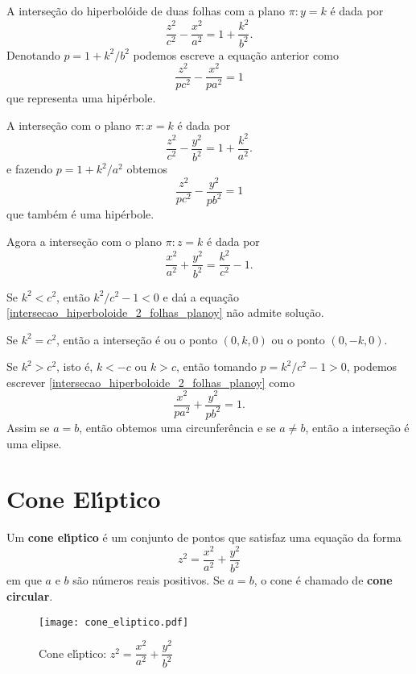 A interse\c{c}\~ao do hiperbol\'oide de duas folhas com a plano $\pi: y = k$ \'e dada por
\[
	\dfrac{z^2}{c^2} - \dfrac{x^2}{a^2} = 1 +  \dfrac{k^2}{b^2}.
\]
Denotando $p = 1 + k^2/b^2$ podemos escreve a equa\c{c}\~ao anterior como
\[
	\dfrac{z^2}{pc^2} - \dfrac{x^2}{pa^2} = 1
\]
que representa uma hip\'erbole.

A interse\c{c}\~ao com o plano $\pi: x = k$ \'e dada por
\[
	\dfrac{z^2}{c^2} - \dfrac{y^2}{b^2} = 1 +  \dfrac{k^2}{a^2}.
\]
e fazendo $p = 1 + k^2/a^2$ obtemos
\[
	\dfrac{z^2}{pc^2} - \dfrac{y^2}{pb^2} = 1
\]
que tamb\'em \'e uma hip\'erbole.

Agora a interse\c{c}\~ao com o plano $\pi : z = k$ \'e dada por
\begin{equation}\label{intersecao_hiperboloide_2_folhas_planoy}
	\dfrac{x^2}{a^2} + \dfrac{y^2}{b^2} = \dfrac{k^2}{c^2} - 1.	
\end{equation}

Se $k^2 < c^2$, ent\~ao $k^2/c^2 - 1 < 0$ e da{\'\i} a equa\c{c}\~ao \eqref{intersecao_hiperboloide_2_folhas_planoy} n\~ao admite solu\c{c}\~ao.

Se $k^2 = c^2$, ent\~ao a interse\c{c}\~ao \'e ou o ponto $(0,k,0)$ ou o ponto $(0,-k,0)$.

Se $k^2 > c^2$, isto \'e, $k < -c$ ou $k > c$, ent\~ao tomando $p = k^2/c^2 - 1 > 0$, podemos escrever \eqref{intersecao_hiperboloide_2_folhas_planoy} como
\[
	\dfrac{x^2}{pa^2} + \dfrac{y^2}{pb^2} = 1.
\]
Assim se $a = b$, ent\~ao obtemos uma circunfer\^encia e se $a \ne b$, ent\~ao a interse\c{c}\~ao \'e uma elipse.


\section{Cone El{\'\i}ptico} %
\label{sec:cone_eliptico}

\begin{definicao}
	Um \textbf{cone el{\'\i}ptico} \'e um conjunto de pontos que satisfaz uma equa\c{c}\~ao da forma
	\begin{equation}\label{cone_eliptico}
		z^2 = \dfrac{x^2}{a^2} + \dfrac{y^2}{b^2}
	\end{equation}
	em que $a$ e $b$ s\~ao n\'umeros reais positivos. Se $a = b$, o cone \'e chamado de \textbf{cone circular}.
\end{definicao}

\begin{figure}[!hp]
	\centering
	\caption{Cone el{\'\i}ptico: $z^2 = \dfrac{x^2}{a^2} + \dfrac{y^2}{b^2}$}
	\texttt{[image: cone\_eliptico.pdf]}
\end{figure}

